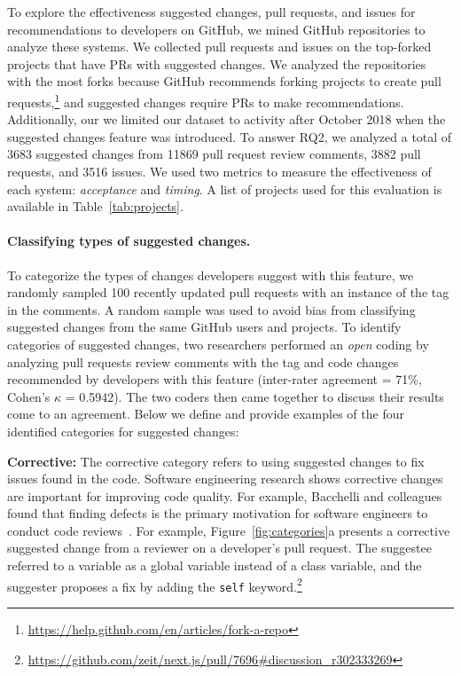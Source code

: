 To explore the effectiveness suggested changes, pull requests, and issues for recommendations to developers on GitHub, we mined GitHub repositories to analyze these systems. We collected pull requests and issues on the top-forked projects that have PRs with suggested changes. We analyzed the repositories with the most forks because GitHub recommends forking projects to create pull requests,\footnote{\url{https://help.github.com/en/articles/fork-a-repo}} and suggested changes require PRs to make recommendations. Additionally, our we  limited our dataset to activity after October 2018 when the suggested changes feature was introduced. To answer RQ2, we analyzed a total of 3683 suggested changes from 11869 pull request review comments, 3882 pull requests, and 3516 issues. We used two metrics to measure the effectiveness of each system: \textit{acceptance} and \textit{timing}. A list of projects used for this evaluation is available in Table~\ref{tab:projects}. 

\paragraph{Classifying types of suggested changes.}
To categorize the types of changes developers suggest with this feature, we randomly sampled 100 recently updated pull requests with an instance of the \sugg tag in the comments. A random sample was used to avoid bias from classifying suggested changes from the same GitHub users and projects. To identify categories of suggested changes, two researchers performed an \textit{open} coding by analyzing pull requests review comments with the \sugg tag and code changes recommended by developers with this feature (inter-rater agreement = 71\%, Cohen's $\kappa$ = 0.5942). The two coders then came together to discuss their results come to an agreement. Below we define and provide examples of the four identified categories for suggested changes:

\textbf{Corrective:} The corrective category refers to using suggested changes to fix issues found in the code. Software engineering research shows corrective changes are important for improving code quality. For example, Bacchelli and colleagues found that finding defects is the primary motivation for software engineers to conduct code reviews~\cite{bacchelli2013codereview}. For example, Figure~\ref{fig:categories}a presents a corrective suggested change from a reviewer on a developer's pull request. The suggestee referred to a variable as a global variable instead of a class variable, and the suggester proposes a fix by adding the \texttt{self} keyword.\footnote{\url{https://github.com/zeit/next.js/pull/7696#discussion_r302333269}}

